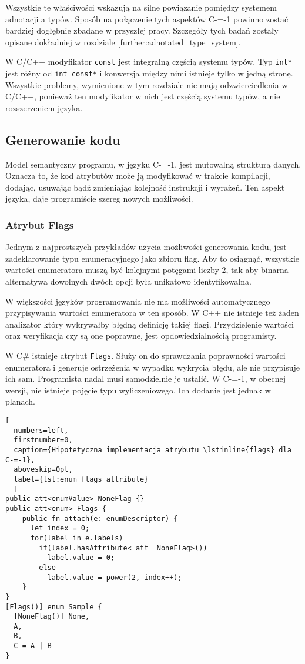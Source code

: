 Wszystkie te właściwości wskazują na silne powiązanie pomiędzy systemem adnotacji a typów.
Sposób na połączenie tych aspektów C-=-1 powinno zostać bardziej dogłębnie zbadane w przyszłej pracy.
Szczegóły tych badań zostały opisane dokładniej w rozdziale \ref{further:adnotated_type_system}.


W C/C++ modyfikator \lstinline{const} jest integralną częścią systemu typów.
Typ \lstinline{int*} jest różny od \lstinline{int const*} i konwersja między nimi istnieje tylko w jedną stronę.
Wszystkie problemy, wymienione w tym rozdziale nie mają odzwierciedlenia w C/C++, ponieważ ten modyfikator w nich jest częścią systemu typów, a nie rozszerzeniem języka.

\subsection{Generowanie kodu}
\label{code_generation}

Model semantyczny programu, w języku C-=-1, jest mutowalną strukturą danych.
Oznacza to, że kod atrybutów może ją modyfikować w trakcie kompilacji, dodając, usuwając bądź zmieniając kolejność instrukcji i wyrażeń.
Ten aspekt języka, daje programiście szereg nowych możliwości.

\subsubsection{Atrybut Flags}

Jednym z najprostszych przykładów użycia możliwości generowania kodu, jest zadeklarowanie typu enumeracyjnego jako zbioru flag.
Aby to osiągnąć, wszystkie wartości enumeratora muszą być kolejnymi potęgami liczby 2, tak aby binarna alternatywa dowolnych dwóch opcji była unikatowo identyfikowalna.

W większości języków programowania nie ma możliwości automatycznego przypisywania wartości enumeratora w ten sposób.
W C++ nie istnieje też żaden analizator który wykrywałby błędną definicję takiej flagi.
Przydzielenie wartości oraz weryfikacja czy są one poprawne, jest opdowiedzialnością programisty.

W C\# istnieje atrybut \lstinline{Flags}.
Służy on do sprawdzania poprawności wartości enumeratora i generuje ostrzeżenia w wypadku wykrycia błędu, ale nie przypisuje ich sam.
Programista nadal musi samodzielnie je ustalić.
W C-=-1, w obecnej wersji, nie istnieje pojęcie typu wyliczeniowego.
Ich dodanie jest jednak w planach.

\begin{minipage}{\textwidth}
\begin{lstlisting}[
  numbers=left,
  firstnumber=0,
  caption={Hipotetyczna implementacja atrybutu \lstinline{flags} dla C-=-1},
  aboveskip=0pt,
  label={lst:enum_flags_attribute}
  ]
public att<enumValue> NoneFlag {}
public att<enum> Flags {
    public fn attach(e: enumDescriptor) {
      let index = 0;
      for(label in e.labels)
        if(label.hasAttribute<_att_ NoneFlag>())
          label.value = 0;
        else
          label.value = power(2, index++);
    }
}
[Flags()] enum Sample {
  [NoneFlag()] None,
  A,
  B,
  C = A | B
}
\end{lstlisting}
\end{minipage}

